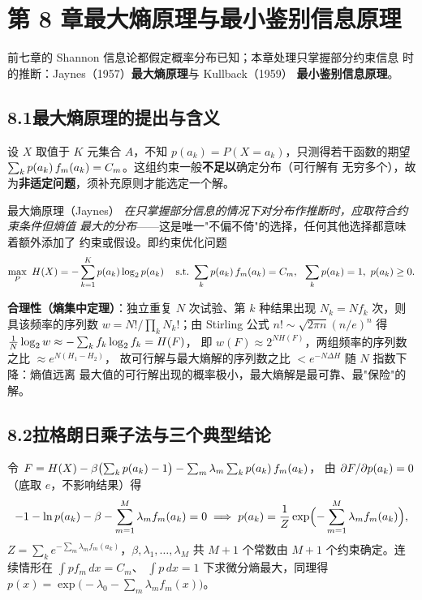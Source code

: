 
\setcounter{section}{7}
\section{第 8 章\quad 最大熵原理与最小鉴别信息原理}

前七章的 Shannon 信息论都假定概率分布已知；本章处理只掌握部分约束信息
时的推断：Jaynes（1957）\textbf{最大熵原理}与 Kullback（1959）
\textbf{最小鉴别信息原理}。

\subsection{8.1\quad 最大熵原理的提出与含义}

设 $X$ 取值于 $K$ 元集合 $A$，不知 $p(a_k)=P(X=a_k)$，只测得若干函数的期望
$\sum_{k}p\!\left(a_k\right)f_m(a_k)=C_m$。这组约束一般\textbf{不足以}确定分布（可行解有
无穷多个），故为\textbf{非适定问题}，须补充原则才能选定一个解。

\begin{defbox}{最大熵原理（Jaynes）}
\emph{在只掌握部分信息的情况下对分布作推断时，应取符合约束条件但熵值
最大的分布}——这是唯一"不偏不倚"的选择，任何其他选择都意味着额外添加了
约束或假设。即约束优化问题
\begin{align*}
\max_{P}\ H\!\left(X\right)=-\sum_{k=1}^{K}p\!\left(a_k\right)\log_{2}p\!\left(a_k\right)\quad
\text{s.t.}\ \sum_{k}p\!\left(a_k\right)f_m(a_k)=C_m,\ \
\sum_{k}p\!\left(a_k\right)=1,\ p\!\left(a_k\right)\ge0 .
\end{align*}
\end{defbox}

\textbf{合理性（熵集中定理）}：独立重复 $N$ 次试验、第 $k$ 种结果出现
$N_k=Nf_k$ 次，则具该频率的序列数 $w=N!/\prod_kN_k!$；由 Stirling 公式
$n!\sim\sqrt{2\pi n}(n/e)^n$ 得 $\frac1N\log_{2} w\approx-\sum_kf_k\log_{2} f_k=H(F)$，
即 $w(F)\approx2^{NH(F)}$，两组频率的序列数之比 $\approx e^{N(H_1-H_2)}$，
故可行解与最大熵解的序列数之比 $<e^{-N\Delta H}$ 随 $N$ 指数下降：熵值远离
最大值的可行解出现的概率极小，最大熵解是最可靠、最"保险"的解。

\subsection{8.2\quad 拉格朗日乘子法与三个典型结论}

令 $F=H(X)-\beta\bigl(\sum_kp\!\left(a_k\right)-1\bigr)-\sum_m\lambda_m\sum_kp\!\left(a_k\right)f_m(a_k)$，
由 $\partial F/\partial p\!\left(a_k\right)=0$（底取 $e$，不影响结果）得
\begin{align*}
-1-\ln p\!\left(a_k\right)-\beta-\sum_{m=1}^{M}\lambda_mf_m(a_k)=0
\;\Longrightarrow\;
p\!\left(a_k\right)=\frac{1}{Z}\exp\Bigl(-\sum_{m=1}^{M}\lambda_mf_m(a_k)\Bigr),
\end{align*}
$Z=\sum_k e^{-\sum_m\lambda_mf_m(a_k)}$，$\beta,\lambda_1,\dots,\lambda_M$ 共
$M+1$ 个常数由 $M+1$ 个约束确定。连续情形在 $\int pf_m\,dx=C_m$、
$\int p\,dx=1$ 下求微分熵最大，同理得
$p(x)=\exp\bigl(-\lambda_0-\sum_m\lambda_mf_m(x)\bigr)$。

